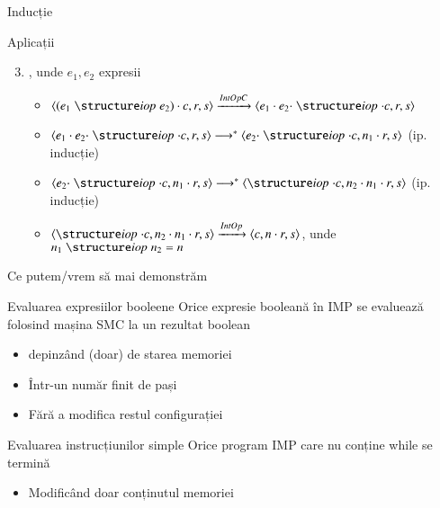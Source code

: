 \documentclass[xcolor=pdftex,romanian,colorlinks]{beamer}
\begin{document}
\begin{section}{Inducție}
\begin{subsection}{Aplicații}
\begin{frame}{}{}
\begin{block}{}
\begin{enumerate}
  \setcounter{enumi}{2}
  \item 
{}, unde $e_1, e_2$ expresii
\begin{itemize}
\item $\c{(e_1 \iop e_2) \cdot c, r, s}  \xrightarrow{IntOpC} \c{e_1 \cdot e_2 \cdot \iop \cdot c, r, s}$
\item $\c{e_1 \cdot e_2 \cdot \iop \cdot c, r, s} \longrightarrow^\ast \c{e_2 \cdot \iop \cdot c, n_1 \cdot r, s}$ \hfill (ip. inducție)
\item $\c{e_2 \cdot \iop \cdot c, n_1 \cdot r, s}  \longrightarrow^\ast \c{\iop \cdot c, n_2 \cdot n_1 \cdot r, s} $ \hfill (ip. inducție)
\item $\c{\iop \cdot c, n_2 \cdot n_1 \cdot r, s}\xrightarrow{IntOp} \c{c, n \cdot r, s}$, unde $n_1 \iop n_2 = n$
\end{itemize}
\end{enumerate}
\end{block}
\end{frame}

\begin{frame}{Ce putem/vrem să mai demonstrăm}
\begin{block}{Evaluarea expresiilor booleene}
Orice expresie booleană în IMP se evaluează folosind mașina SMC la un rezultat boolean
\begin{itemize}
\item depinzând (doar) de starea memoriei
\item Într-un număr finit de pași
\item Fără a modifica restul configurației
\end{itemize}
\end{block}
\begin{block}{Evaluarea instrucțiunilor simple}
Orice program IMP care nu conține while se termină
\begin{itemize}
\item Modificând doar conținutul memoriei
\end{itemize}
\end{block}

\end{frame}

\end{subsection}
\end{section}
\end{document}
